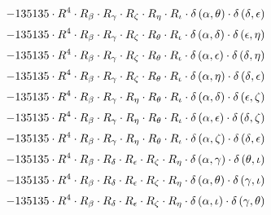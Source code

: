 \begin{subequations}
\begin{gather}
 \\[0.2em] \notag 		 - 135135 \cdot R^{4} \cdot R_{\beta{}} \cdot R_{\gamma{}} \cdot R_{\zeta{}} \cdot R_{\eta{}} \cdot R_{\iota{}} \cdot \delta{}\left(\alpha{}, \theta{}\right) \cdot \delta{}\left(\delta{}, \epsilon{}\right) 
 \\[0.2em] \notag 		 - 135135 \cdot R^{4} \cdot R_{\beta{}} \cdot R_{\gamma{}} \cdot R_{\zeta{}} \cdot R_{\theta{}} \cdot R_{\iota{}} \cdot \delta{}\left(\alpha{}, \delta{}\right) \cdot \delta{}\left(\epsilon{}, \eta{}\right) 
 \\[0.2em] \notag 		 - 135135 \cdot R^{4} \cdot R_{\beta{}} \cdot R_{\gamma{}} \cdot R_{\zeta{}} \cdot R_{\theta{}} \cdot R_{\iota{}} \cdot \delta{}\left(\alpha{}, \epsilon{}\right) \cdot \delta{}\left(\delta{}, \eta{}\right) 
 \\[0.2em] \notag 		 - 135135 \cdot R^{4} \cdot R_{\beta{}} \cdot R_{\gamma{}} \cdot R_{\zeta{}} \cdot R_{\theta{}} \cdot R_{\iota{}} \cdot \delta{}\left(\alpha{}, \eta{}\right) \cdot \delta{}\left(\delta{}, \epsilon{}\right) 
 \\[0.2em] \notag 		 - 135135 \cdot R^{4} \cdot R_{\beta{}} \cdot R_{\gamma{}} \cdot R_{\eta{}} \cdot R_{\theta{}} \cdot R_{\iota{}} \cdot \delta{}\left(\alpha{}, \delta{}\right) \cdot \delta{}\left(\epsilon{}, \zeta{}\right) 
 \\[0.2em] \notag 		 - 135135 \cdot R^{4} \cdot R_{\beta{}} \cdot R_{\gamma{}} \cdot R_{\eta{}} \cdot R_{\theta{}} \cdot R_{\iota{}} \cdot \delta{}\left(\alpha{}, \epsilon{}\right) \cdot \delta{}\left(\delta{}, \zeta{}\right) 
 \\[0.2em] \notag 		 - 135135 \cdot R^{4} \cdot R_{\beta{}} \cdot R_{\gamma{}} \cdot R_{\eta{}} \cdot R_{\theta{}} \cdot R_{\iota{}} \cdot \delta{}\left(\alpha{}, \zeta{}\right) \cdot \delta{}\left(\delta{}, \epsilon{}\right) 
 \\[0.2em] \notag 		 - 135135 \cdot R^{4} \cdot R_{\beta{}} \cdot R_{\delta{}} \cdot R_{\epsilon{}} \cdot R_{\zeta{}} \cdot R_{\eta{}} \cdot \delta{}\left(\alpha{}, \gamma{}\right) \cdot \delta{}\left(\theta{}, \iota{}\right) 
 \\[0.2em] \notag 		 - 135135 \cdot R^{4} \cdot R_{\beta{}} \cdot R_{\delta{}} \cdot R_{\epsilon{}} \cdot R_{\zeta{}} \cdot R_{\eta{}} \cdot \delta{}\left(\alpha{}, \theta{}\right) \cdot \delta{}\left(\gamma{}, \iota{}\right) 
 \\[0.2em] \notag 		 - 135135 \cdot R^{4} \cdot R_{\beta{}} \cdot R_{\delta{}} \cdot R_{\epsilon{}} \cdot R_{\zeta{}} \cdot R_{\eta{}} \cdot \delta{}\left(\alpha{}, \iota{}\right) \cdot \delta{}\left(\gamma{}, \theta{}\right) 

\end{gather}
\end{subequations}
